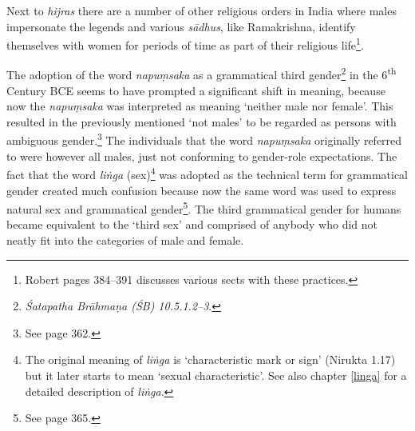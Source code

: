 Next to {\em hijras} there are a number of other religious orders in India where males impersonate the legends and various {\em sādhus}, like Ramakrishna, identify themselves with women for periods of time as part of their religious life\footnote{Robert \cite{goldman} pages 384–391 discusses various sects with these practices.}.

The adoption of the word {\em napuṃsaka} as a grammatical third gender\footnote{{\em Śatapatha Brāhmaṇa (ŚB) 10.5.1.2–3}.} in the 6\textsuperscript{th} Century BCE seems to have prompted a significant shift in meaning, because now the {\em napuṃsaka} was interpreted as meaning `neither male nor female'. This resulted in the previously mentioned `not males' to be regarded as persons with ambiguous gender.\footnote{See \cite{zwilling2000} page 362.} The individuals that the word {\em napuṃsaka} originally referred to were however all males, just not conforming to gender-role expectations. The fact that the word {\em liṅga} (sex)\footnote{The original meaning of {\em liṅga} is `characteristic mark or sign' (Nirukta 1.17) but it later starts to mean `sexual characteristic'. See also chapter \ref{linga} for a detailed description of {\em liṅga}.} was adopted as the technical term for grammatical gender created much confusion because now the same word was used to express natural sex and grammatical gender\footnote{See \cite{zwilling} page 365.}. The third grammatical gender for humans became equivalent to the `third sex' and comprised of anybody who did not neatly fit into the categories of male and female.


